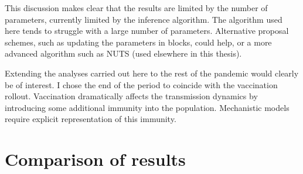 \documentclass[thesis.tex]{subfiles}
\begin{document}
This discussion makes clear that the results are limited by the number of parameters, currently limited by the inference algorithm.
The algorithm used here tends to struggle with a large number of parameters.
Alternative proposal schemes, such as updating the parameters in blocks, could help, or a more advanced algorithm such as NUTS (used elsewhere in this thesis).

Extending the analyses carried out here to the rest of the pandemic would clearly be of interest.
I chose the end of the period to coincide with the vaccination rollout.
Vaccination dramatically affects the transmission dynamics by introducing some additional immunity into the population.
Mechanistic models require explicit representation of this immunity.

\section{Comparison of results} \label{transmission:sec:comparison}
\end{document}
